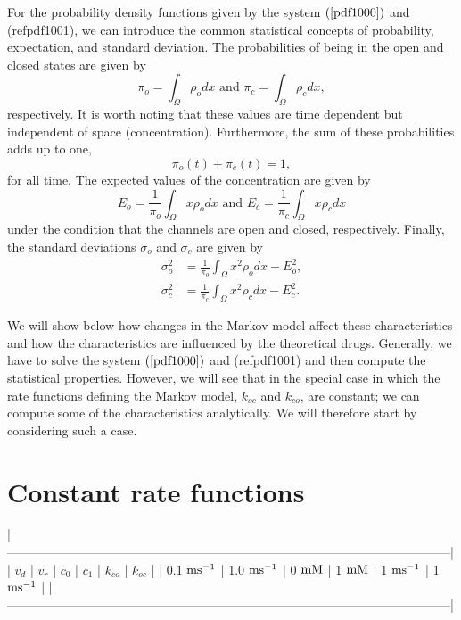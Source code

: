 \bigskip For the probability density functions given by the system $\left(
\ref{pdf1000}\right)$ and (ref{pdf1001}), we can introduce the common statistical
concepts of probability, expectation, and standard deviation. The probabilities of
being in the open and closed states are given by
\begin{equation}
\pi_{o}=\int_{\Omega}\rho_{o}dx \text{ and }\pi_{c}=\int_{\Omega}\rho_{c}dx,
\label{probability}
\end{equation}
respectively. It is worth noting that these values are time dependent but
independent of space (concentration). Furthermore, the sum of these
probabilities adds up to one,
\[
\pi_{o}\left(  t\right)  +\pi_{c}\left(  t\right)  =1,
\]
for all time. The expected values of the concentration are given by
\begin{equation}
E_{o}=\frac{1}{\pi_{o}}\int_{\Omega}x\rho_{o}dx \text{ and }E_{c}=\frac{1}
{\pi_{c}}\int_{\Omega}x\rho_{c}dx \label{expectation}
\end{equation}
under the condition that the channels are open and closed, respectively. Finally, the standard deviations $\sigma_{o}$ and $\sigma_{c}$ are given by
\begin{align}
\sigma_{o}^{2}  &  =\frac{1}{\pi_{o}}\int_{\Omega}x^{2}\rho_{o}dx-E_{o}^{2},\label{stdvo}\\
\sigma_{c}^{2}  &  =\frac{1}{\pi_{c}}\int_{\Omega}x^{2}\rho_{c}dx-E_{c}^{2}. \label{stdvc}
\end{align}

We will show below how changes in the Markov model affect these
characteristics and how the characteristics are influenced by the
theoretical drugs. Generally, we have to solve the system $\left(
\ref{pdf1000}\right)$ and (ref{pdf1001}) and then compute the statistical
properties. However, we will see that in the special case in which the rate functions
defining the Markov model, $k_{oc}$ and $k_{co}$, are constant; we can compute some of
the characteristics analytically.  We will therefore start by considering such a case.



\section{Constant rate functions}
\label{consrate}
|-----------------------------------------------------------------------------------------------------------|
| $v_d$              | $v_r$              | $c_0$       | $c_1$       | $k_{co}$         | $k_{oc} $        |
| 0.1 $\rm{ms^{-1}}$ | 1.0 $\rm{ms^{-1}}$ | 0 $\rm{mM}$ | 1 $\rm{mM}$ | 1 $\rm{ms^{-1}}$ | 1 $\rm{ms^{-1}}$ |
|-----------------------------------------------------------------------------------------------------------|


